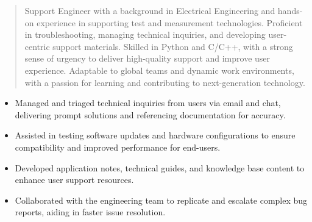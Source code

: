 



\makecvheader

\begin{quote}
  \noindent
  Support Engineer with a background in Electrical Engineering and hands-on experience in supporting test and measurement technologies. Proficient in troubleshooting, managing technical inquiries, and developing user-centric support materials. Skilled in Python and C/C++, with a strong sense of urgency to deliver high-quality support and improve user experience. Adaptable to global teams and dynamic work environments, with a passion for learning and contributing to next-generation technology.
\end{quote}

\par\smallskip
\noindent
\begin{minipage}{20cm}
  \begin{minipage}{9.75cm}
    \begin{itemize}
      \item Managed and triaged technical inquiries from users via email and chat, delivering prompt solutions and referencing documentation for accuracy.
      \item Assisted in testing software updates and hardware configurations to ensure compatibility and improved performance for end-users.
    \end{itemize}
  \end{minipage}
  \hfill
  \begin{minipage}{9.75cm}
    \begin{itemize}
      \item Developed application notes, technical guides, and knowledge base content to enhance user support resources.
      \item Collaborated with the engineering team to replicate and escalate complex bug reports, aiding in faster issue resolution.
    \end{itemize}
  \end{minipage}
\end{minipage}
\par\smallskip
\divider

